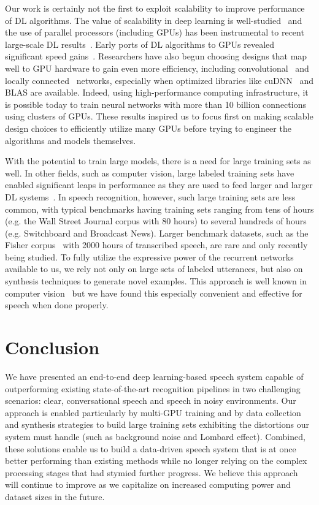 \documentclass{article}
\begin{document}
Our work is certainly not the first to exploit scalability to improve
performance of DL algorithms.  The value of scalability in deep learning is
well-studied~\cite{coates2011kmeans,le2012faces} and the use of parallel
processors (including GPUs) has been instrumental to recent large-scale DL
results~\cite{GoogLeNet,le2012faces}.  Early ports of DL algorithms to GPUs
revealed significant speed gains~\cite{raina2009large}.  Researchers have also
begun choosing designs that map well to GPU hardware to gain even more
efficiency, including
convolutional~\cite{krizhevsky2012imagenet,ciresan2011highperf,Sainath2013} and
locally connected~\cite{coates2013cotshpc,ciresan2012multicolumn} networks,
especially when optimized libraries like cuDNN~\cite{Chetlur:14} and BLAS are
available.  Indeed, using high-performance computing infrastructure, it is
possible today to train neural networks with more than 10 billion
connections~\cite{coates2013cotshpc} using clusters of GPUs.  These results
inspired us to focus first on making scalable design choices to efficiently
utilize many GPUs before trying to engineer the algorithms and models
themselves.

With the potential to train large models, there is a need for large training
sets as well.  In other fields, such as computer vision, large labeled training
sets have enabled significant leaps in performance as they are used to feed
larger and larger DL systems~\cite{GoogLeNet,krizhevsky2012imagenet}.  In
speech recognition, however, such large training sets are less common, with
typical benchmarks having training sets ranging from tens of hours (e.g. the
Wall Street Journal corpus with 80 hours) to several hundreds of hours (e.g.
Switchboard and Broadcast News). Larger benchmark datasets, such as the Fisher
corpus~\cite{Cieri2004Fisher} with 2000 hours of transcribed speech, are rare
and only recently being studied.  To fully utilize the expressive power of the
recurrent networks available to us, we rely not only on large sets of labeled
utterances, but also on synthesis techniques to generate novel examples.  This
approach is well known in computer
vision~\cite{sapp2008synth,lecun2004learningmethods,coates2011icdar} but we
have found this especially convenient and effective for speech when done
properly.

\section{Conclusion}
We have presented an end-to-end deep learning-based speech system capable of
outperforming existing state-of-the-art recognition pipelines in two
challenging scenarios: clear, conversational speech and speech in noisy
environments.  Our approach is enabled particularly by multi-GPU training and
by data collection and synthesis strategies to build large training sets
exhibiting the distortions our system must handle (such as background noise and
Lombard effect).  Combined, these solutions enable us to build a data-driven
speech system that is at once better performing than existing methods while no
longer relying on the complex processing stages that had stymied further
progress.  We believe this approach will continue to improve as we capitalize
on increased computing power and dataset sizes in the future.
\end{document}
